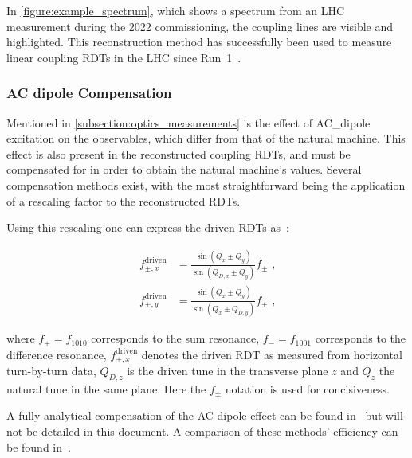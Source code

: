 In \cref{figure:example_spectrum}, which shows a spectrum from an LHC measurement during the \num{2022} commissioning, the coupling lines are visible and highlighted.
This reconstruction method has successfully been used to measure linear coupling RDTs in the LHC since Run~\num{1}~\cite{PRAB:Benedikt:Driving_Term_Experiments_CERN,IPAC:Persson:Automatic_Coupling_Correction_LHC_Injection_Oscillations,IPAC:Miyamoto:Measurement_Coupling_RDTs_LHC_AC_Dipole}.

\subsubsection*{AC dipole Compensation}

Mentioned in \cref{subsection:optics_measurements} is the effect of \gls{AC_dipole} excitation on the observables, which differ from that of the natural machine.
This effect is also present in the reconstructed coupling \glspl{RDT}, and must be compensated for in order to obtain the natural machine's values.
Several compensation methods exist, with the most straightforward being the application of a rescaling factor to the reconstructed \glspl{RDT}.

Using this rescaling one can express the driven \glspl{RDT} as~\cite{IPAC:Wegscheider:Forced_Coupling_Resonance_Driving_Terms}:

\begin{equation}
  \begin{aligned}
    f_{\pm, x}^{\mathrm{driven}} &= \frac{\sin \left( Q_x \pm Q_y \right)}{\sin \left( Q_{D,x} \pm Q_y \right)} f_{\pm} \text{ ,} \\
    f_{\pm, y}^{\mathrm{driven}} &= \frac{\sin \left( Q_x \pm Q_y \right)}{\sin \left( Q_x \pm Q_{D,y} \right)} f_{\pm} \text{ ,}
  \end{aligned}
  \label{equation:rescaling_coupling_rdts}
\end{equation}
\vspace{1pt}

\noindent
where \(f_{+} = f_{1010}\) corresponds to the sum resonance, \(f_{-} = f_{1001}\) corresponds to the difference resonance, \(f_{\pm, x}^{\mathrm{driven}}\) denotes the driven \gls{RDT} as measured from horizontal turn-by-turn data, \(Q_{D, z}\) is the driven tune in the transverse plane \(z\) and \(Q_z\) the natural tune in the same plane.
Here the \(f_{\pm}\) notation is used for concisiveness.

A fully analytical compensation of the AC dipole effect can be found in~\cite{REPORT:Miyamoto:Measurement_Coupling_Resonance_Driving_Terms,IPAC:Miyamoto:Measurement_Coupling_RDTs_LHC_AC_Dipole} but will not be detailed in this document.
A comparison of these methods' efficiency can be found in~\cite{IPAC:Wegscheider:NBPM_Momentum_Reconstruction_for_Linear_Coupling_RDTs}.

